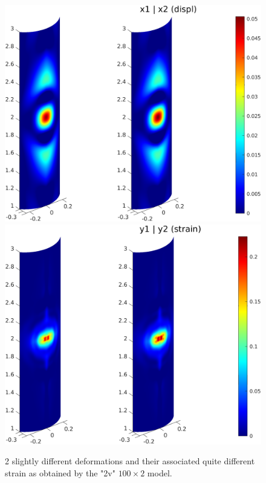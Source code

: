 	\begin{figure}[t!]
\includegraphics[scale=0.5]{deform.png} \hspace{0.8cm}
\includegraphics[scale=0.5]{strain.png}
\caption{2 slightly different deformations and their associated quite different strain as obtained by the "2v" $100 \times 2$ model.}
\label{fig5}
\end{figure}	


